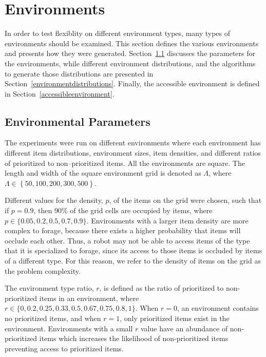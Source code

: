 \section{Environments}
\label{experimentenvironments}

In order to test flexiblity on different environment types, many types of environments should be examined. This section defines the various environments and presents how they were generated. Section~\ref{environmentalparameters} discusses the parameters for the environments, while different environment distributions, and the algorithms to generate those distributions are presented in Section~\ref{environmentdistributions}. Finally, the accessible environment is defined in Section~\ref{accessibleenvironment}.

\subsection{Environmental Parameters}
\label{environmentalparameters}
The experiments were run on different environments where each environment has different item distributions, environment sizes, item densities, and different ratios of prioritized to non--prioritized items. All the environments are square. The length and width of the square environment grid is denoted as $\Lambda$, where $\Lambda\in \left\{ 50, 100, 200, 300, 500\right\}$.

Different values for the density, $p$, of the items on the grid were chosen, such that if $p=0.9$, then 90\% of the grid cells are occupied by items, where $p\in \{ 0.05,\allowbreak 0.2,\allowbreak 0.5,\allowbreak 0.7,\allowbreak 0.9\}$. Environments with a larger item density are more complex to forage, because there exists a higher probability that items will occlude each other. Thus, a robot may not be able to access items of the type that it is specialized to forage, since its access to those items is occluded by items of a different type. For this reason, we refer to the density of items on the grid as the problem complexity.

The environment type ratio, $r$, is defined as the ratio of prioritized to non-prioritized items in an environment, where $r\in \{0,\allowbreak 0.2,\allowbreak 0.25,\allowbreak 0.33,\allowbreak 0.5,\allowbreak 0.67,\allowbreak 0.75,\allowbreak 0.8, 1\}$. When $r=0$, an environment contains no prioritized items, and when $r=1$, only prioritized items exist in the environment. Environments with a small $r$ value have an abundance of non-prioritized items which increases the likelihood of non-prioritized items preventing access to prioritized items.

